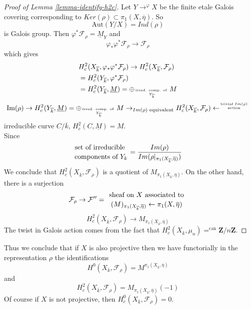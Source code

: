 \begin{proof}[Proof of Lemma \ref{lemma-identify-h2c}]
Let $Y\to^{\varphi}X$ be the finite etale Galois covering
corresponding to $Ker(\rho)\subset \pi_1(X, \overline\eta)$. So
$$
\text{Aut}(Y/X)=Ind(\rho)
$$
is Galois group. Then $\varphi^*\mathcal{F}_\rho =\underline M_Y$ and
$$
\varphi_*\varphi^*\mathcal{F}_\rho\to \mathcal{F}_\rho
$$
which gives
\begin{align*}
&H_c^2(X_{\overline k}, \varphi_*\varphi^*\mathcal{F}_\rho) \to
H_c^2(X_{\overline k}, \mathcal{F}_\rho)\\
&=H_c^2(Y_{\overline k}, \varphi^*\mathcal{F}_\rho)\\
&=H_c^2(Y_{\overline k}, \underline M) = \oplus_{\text{irred.
comp. of }\atop Y_{\overline k}}M
\end{align*}
$$
\text{Im}(\rho)\rightarrow H_c^2(Y_{\overline k}, \underline M) =
\oplus_{\text{irred. comp. of }\atop Y_{\overline k}}M\to_{Im(\rho)\text{
equivalent}} H_c^2(X_{\overline k},
\mathcal{F}_{\rho})\leftarrow^{\text{trivial }Im(\rho)\atop \text{action}}
$$
irreducible curve $C/\overline k$, $H_c^2(C, \underline M)=M$.
\\
Since
$$
{\text{set of irreducible }\atop\text{components of }Y_k} =
\frac{Im(\rho)}{Im(\rho|_{\pi_1(X_{\overline k}, \overline \eta)})}
$$
We conclude that $H_c^2(X_{\overline k}, \mathcal{F}_\rho)$ is a
quotient of $M_{\pi_1(X_{\overline k}, \overline \eta)}$. On the other hand,
there is a surjection
$$
\mathcal{F}_\rho\to \mathcal{F}'' = {\text{ sheaf on }
X\text{ associated to }\atop (M)_{\pi_1(X_{\overline k}, \overline
\eta)}\leftarrow\pi_1(X, \overline \eta)}
$$
$$
H_c^2(X_{\overline k}, \mathcal{F}_\rho)\to
M_{\pi_1(X_{\overline k}, \overline\eta)}
$$
The twist in Galois action comes from the fact that
$H_c^2(X_{\overline k}, \mu_n)=^{\text{can}} \mathbf{Z}/n\mathbf{Z}$.
\end{proof}

\begin{remark}
\label{remark-projective}
Thus we conclude that if $X$ is also projective then
we have functorially in the representation $\rho$
the identifications
$$
H^0(X_{\overline k}, \mathcal{F}_\rho) =
M^{\pi_1(X_{\overline k}, \overline\eta)}
$$
and
$$
H_c^2(X_{\overline k}, \mathcal{F}_\rho) =
M_{\pi_1(X_{\overline k}, \overline \eta)}(-1)
$$
Of course if $X$ is not projective, then
$H^0_c(X_{\overline{k}}, \mathcal{F}_\rho) = 0$.
\end{remark}



